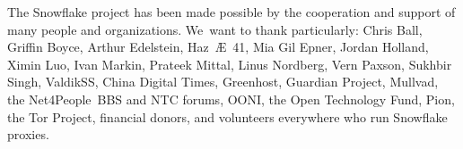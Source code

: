 \documentclass[letterpaper,twocolumn]{article}
\begin{document}
The Snowflake project has been made possible
by the cooperation and support of many people
and organizations.
We~want to thank particularly:
Chris Ball, %
Griffin Boyce, %
Arthur Edelstein, %
Haz~Æ~41, %
Mia Gil Epner, %
Jordan Holland, %
Ximin Luo, %
Ivan Markin, %
Prateek Mittal, %
Linus Nordberg, %
Vern Paxson, %
Sukhbir Singh, %
ValdikSS, %
China Digital Times,
Greenhost, %
Guardian Project, %
Mullvad, %
the Net4People~BBS and NTC forums, %
OONI, %
the Open Technology Fund, %
Pion,
the Tor Project,
financial donors,
and volunteers everywhere who run Snowflake proxies.

{
\raggedright


}
\end{document}
